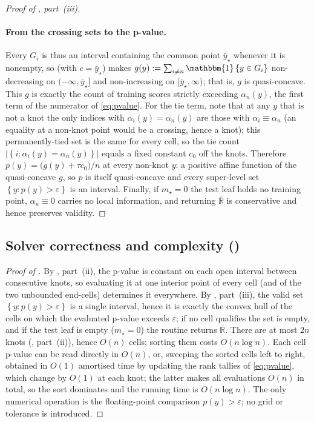 \documentclass[twoside]{article}
\numberwithin{equation}{section}
\theoremstyle{plain}
\theoremstyle{definition}
\theoremstyle{remark}
\newcommand{\set}[1]{\left\{#1\right\}}
\newcommand{\abs}[1]{\left\lvert #1 \right\rvert}
\begin{document}
\begin{proof}[Proof of , part~(iii)]
\paragraph{From the crossing sets to the p-value.}
Every $G_i$ is thus an interval containing the common point $\bar{y}_\star$ whenever it is
nonempty, so  (with $c = \bar{y}_\star$) makes
$g(y) := \sum_{i \neq n} \mathbbm{1}\set{y \in G_i}$ non-decreasing on
$(-\infty, \bar{y}_\star]$ and non-increasing on $[\bar{y}_\star, \infty)$; that is, $g$ is
quasi-concave. This $g$ is exactly the count of training scores strictly exceeding
$\alpha_n(y)$, the first term of the numerator of \eqref{eq:pvalue}. For the tie term,
note that at any $y$ that is not a knot the only indices with $\alpha_i(y) = \alpha_n(y)$
are those with $\alpha_i \equiv \alpha_n$ (an equality at a non-knot point would be a
crossing, hence a knot); this permanently-tied set is the same for every cell, so the tie
count $\abs{\set{i : \alpha_i(y) = \alpha_n(y)}}$ equals a fixed constant $c_0$ off the
knots. Therefore $p(y) = \bigl(g(y) + \tau c_0\bigr)/n$ at every non-knot $y$: a positive
affine function of the quasi-concave $g$, so $p$ is itself quasi-concave and every
super-level set $\set{y : p(y) > \varepsilon}$ is an interval. Finally, if $m_\star = 0$ the
test leaf holds no training point, $\alpha_n \equiv 0$ carries no local information, and
returning $\overline{\mathbb{R}}$ is conservative and hence preserves validity.
\end{proof}

\subsection{Solver correctness and complexity ()}\label{app:reg-solver}

\begin{proof}[Proof of ]
By , part~(ii), the p-value is constant on each open interval between
consecutive knots, so evaluating it at one interior point of every cell (and of the two
unbounded end-cells) determines it everywhere. By , part~(iii), the valid
set $\set{y : p(y) > \varepsilon}$ is a single interval, hence it is exactly the convex hull
of the cells on which the evaluated p-value exceeds $\varepsilon$; if no cell qualifies
the set is empty, and if the test leaf is empty ($m_\star = 0$) the routine returns
$\overline{\mathbb{R}}$. There are at most $2n$ knots (, part~(ii)), hence
$O(n)$ cells; sorting them costs $O(n \log n)$. Each cell p-value can be read directly
in $O(n)$, or, sweeping the sorted cells left to right, obtained in $O(1)$ amortised
time by updating the rank tallies of \eqref{eq:pvalue}, which change by $O(1)$ at each
knot; the latter makes all evaluations $O(n)$ in total, so the sort dominates and the
running time is $O(n \log n)$. The only numerical operation is the floating-point
comparison $p(y) > \varepsilon$; no grid or tolerance is introduced.
\end{proof}
\end{document}
